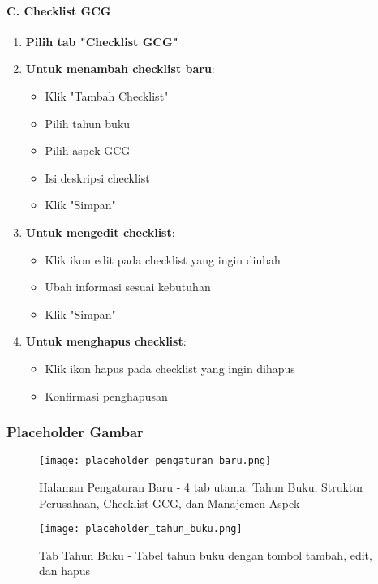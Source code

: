 \documentclass[12pt,a4paper]{article}
\begin{document}
\paragraph{C. Checklist GCG}
\begin{enumerate}
    \item \textbf{Pilih tab "Checklist GCG"}
    \item \textbf{Untuk menambah checklist baru}:
    \begin{itemize}
        \item Klik "Tambah Checklist"
        \item Pilih tahun buku
        \item Pilih aspek GCG
        \item Isi deskripsi checklist
        \item Klik "Simpan"
    \end{itemize}
    \item \textbf{Untuk mengedit checklist}:
    \begin{itemize}
        \item Klik ikon edit pada checklist yang ingin diubah
        \item Ubah informasi sesuai kebutuhan
        \item Klik "Simpan"
    \end{itemize}
    \item \textbf{Untuk menghapus checklist}:
    \begin{itemize}
        \item Klik ikon hapus pada checklist yang ingin dihapus
        \item Konfirmasi penghapusan
    \end{itemize}
\end{enumerate}

\subsubsection{Placeholder Gambar}
\begin{figure}[H]
    \centering
    \texttt{[image: placeholder\_pengaturan\_baru.png]}
    \caption{Halaman Pengaturan Baru - 4 tab utama: Tahun Buku, Struktur Perusahaan, Checklist GCG, dan Manajemen Aspek}
    \label{fig:pengaturan_baru}
\end{figure}

\begin{figure}[H]
    \centering
    \texttt{[image: placeholder\_tahun\_buku.png]}
    \caption{Tab Tahun Buku - Tabel tahun buku dengan tombol tambah, edit, dan hapus}
    \label{fig:tahun_buku}
\end{figure}
\end{document}
